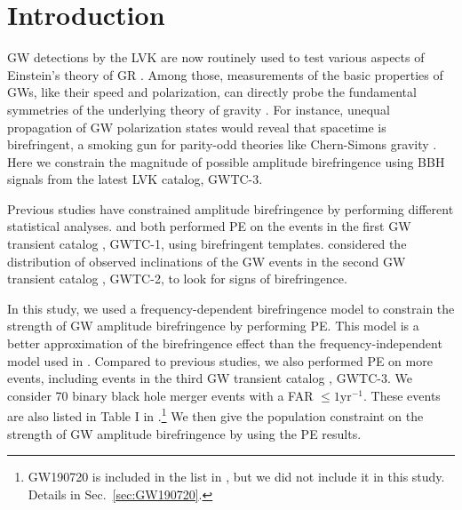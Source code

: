 \documentclass[aps,prd,twocolumn,superscriptaddress,preprintnumbers,floatfix,nofootinbib]{revtex4-2}
\begin{document}
\section{Introduction}
\label{sec:Introduction}
\Ac{GW} detections by the \ac{LVK} \citep{LIGO, Virgo, KAGRA} are now routinely used to test various aspects of Einstein's theory of \ac{GR} \citep{LIGOScientific:2016lio,LIGOScientific:2018dkp,LIGOScientific:2021sio}.
Among those, measurements of the basic properties of \acp{GW}, like their speed and polarization, can directly probe the fundamental symmetries of the underlying theory of gravity \citep{Will:2018bme}.
For instance, unequal propagation of \ac{GW} polarization states would reveal that spacetime is birefringent, a smoking gun for parity-odd theories like Chern-Simons gravity \citep{Jackiw:2003pm,Alexander:2009tp,Sopuerta:2009iy}.
Here we constrain the magnitude of possible amplitude birefringence using \ac{BBH} signals from the latest \ac{LVK} catalog, GWTC-3.

Previous studies have constrained amplitude birefringence by performing different statistical analyses.
\citet{Yamada_2020} and \citet{Wang_2021} both performed \ac{PE} on the events in the first \ac{GW} transient catalog \citep{GWTC-1}, GWTC-1, using birefringent templates.
\citet{Okounkova_2022} considered the distribution of observed inclinations of the \ac{GW} events in the second \ac{GW} transient catalog \citep{GWTC-2}, GWTC-2, to look for signs of birefringence.

In this study, we used a frequency-dependent birefringence model to constrain the strength of \ac{GW} amplitude birefringence by performing \ac{PE}.
This model is a better approximation of the birefringence effect than the frequency-independent model used in \citet{Okounkova_2022}.
Compared to previous studies, we also performed \ac{PE} on more events, including events in the third \ac{GW} transient catalog \citep{GWTC-3}, GWTC-3.
We consider 70 binary black hole merger events with a \ac{FAR} $\leq1\mathrm{yr^{-1}}$.
These events are also listed in Table I in \citet{GWTC-3_population}.\footnote{
GW190720 is included in the list in \citet{GWTC-3_population}, but we did not include it in this study.
Details in Sec.~\ref{sec:GW190720}.}
We then give the population constraint on the strength of \ac{GW} amplitude birefringence by using the \ac{PE} results.
\end{document}
